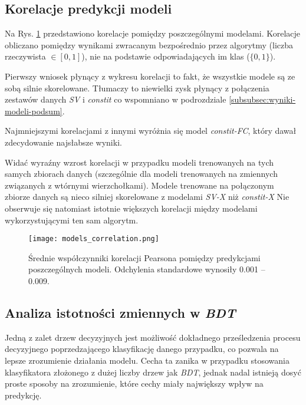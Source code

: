 \subsection{Korelacje predykcji modeli}

Na Rys. \ref{fig:models_corr} przedstawiono korelacje pomiędzy poszczególnymi modelami. Korelacje obliczano pomiędzy wynikami zwracanym bezpośrednio przez algorytmy (liczba rzeczywista $\in [0,1]$), nie na podstawie odpowiadających im klas ($\{0,1\}$).

Pierwszy wniosek płynący z wykresu korelacji to fakt, że wszystkie modele są ze sobą silnie skorelowane. Tłumaczy to niewielki zysk płynący z połączenia zestawów danych \textit{SV} i \textit{constit} co wspomniano w podrozdziale \ref{subsubsec:wyniki-modeli-podsum}.

Najmniejszymi korelacjami z innymi wyróżnia się model \textit{constit-FC}, który dawał zdecydowanie najsłabsze wyniki.

Widać wyraźny wzrost korelacji w przypadku modeli trenowanych na tych samych zbiorach danych (szczególnie dla modeli trenowanych na zmiennych związanych z wtórnymi wierzchołkami). 
Modele trenowane na połączonym zbiorze danych są nieco silniej skorelowane z modelami \textit{SV-X} niż \textit{constit-X}
Nie obserwuje się natomiast istotnie większych korelacji między modelami wykorzystującymi ten sam algorytm.

\begin{figure}[ht]
	\centering
	\texttt{[image: models\_correlation.png]}
	\caption{Średnie współczynniki korelacji Pearsona pomiędzy predykcjami poszczególnych modeli. Odchylenia standardowe wynosiły 0.001 -- 0.009.}
	\label{fig:models_corr}
\end{figure}


\newpage
\FloatBarrier
\subsection{Analiza istotności zmiennych w \textit{BDT}}
\label{subsec:feat-imp}

Jedną z zalet drzew decyzyjnych jest możliwość dokładnego prześledzenia procesu decyzyjnego poprzedzającego klasyfikację danego przypadku, co pozwala na lepsze zrozumienie działania modelu. Cecha ta zanika w przypadku stosowania klasyfikatora złożonego z dużej liczby drzew jak \textit{BDT}, jednak nadal istnieją dosyć proste sposoby na zrozumienie, które cechy miały największy wpływ na predykcję.

